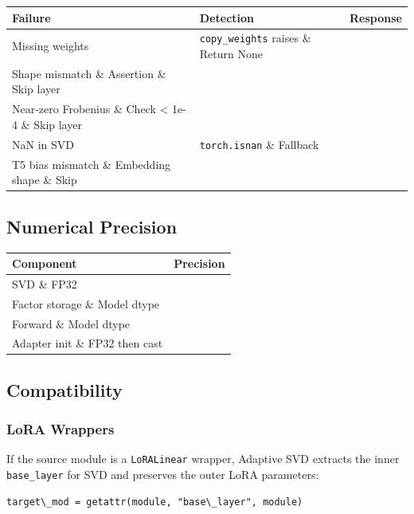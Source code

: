 \begin{table}[H]
\centering
\small
\begin{tabular}{lll}
\toprule
\textbf{Failure} & \textbf{Detection} & \textbf{Response} \\
\midrule
Missing weights & \texttt{copy\_weights} raises \& Return None \\
Shape mismatch \& Assertion \& Skip layer \\
Near-zero Frobenius \& Check \textless{} 1e-4 \& Skip layer \\
NaN in SVD & \texttt{torch.isnan} \& Fallback \\
T5 bias mismatch \& Embedding shape \& Skip \\
\bottomrule
\end{tabular}
\end{table}

\subsection{Numerical Precision}

\begin{table}[H]
\centering
\small
\begin{tabular}{ll}
\toprule
\textbf{Component} & \textbf{Precision} \\
\midrule
SVD \& FP32 \\
Factor storage \& Model dtype \\
Forward \& Model dtype \\
Adapter init \& FP32 then cast \\
\bottomrule
\end{tabular}
\end{table}

\subsection{Compatibility}

\subsubsection{LoRA Wrappers}

If the source module is a \texttt{LoRALinear} wrapper, Adaptive SVD extracts the 
inner \texttt{base\_layer} for SVD and preserves the outer LoRA parameters:

\begin{lstlisting}
target\_mod = getattr(module, "base\_layer", module)
\end{lstlisting}

